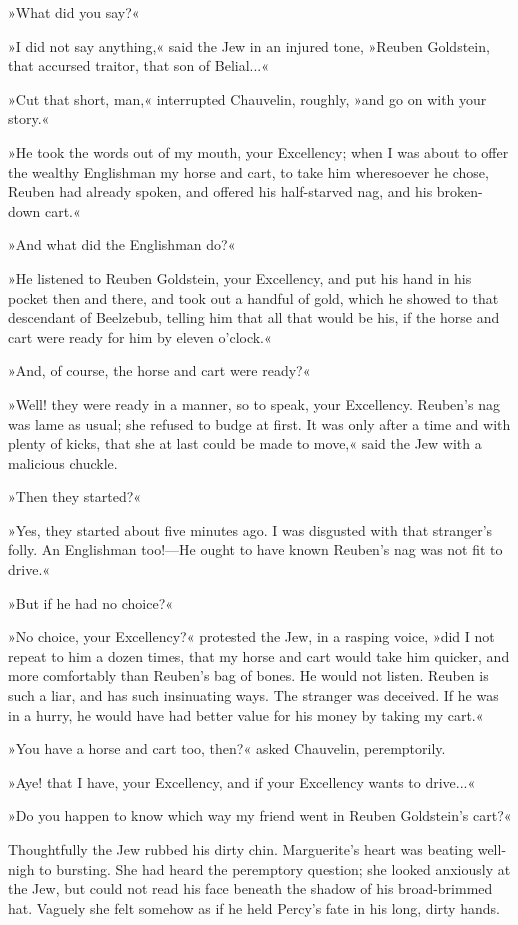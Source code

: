 »What did you say?«

»I did not say anything,« said the Jew in an injured tone, »Reuben Goldstein, that accursed traitor, that son of Belial...«

»Cut that short, man,« interrupted Chauvelin, roughly, »and go on with your story.«

»He took the words out of my mouth, your Excellency; when I was about to offer the wealthy Englishman my horse and cart, to take him wheresoever he chose, Reuben had already spoken, and offered his half-starved nag, and his broken-down cart.«

»And what did the Englishman do?«

»He listened to Reuben Goldstein, your Excellency, and put his hand in his pocket then and there, and took out a handful of gold, which he showed to that descendant of Beelzebub, telling him that all that would be his, if the horse and cart were ready for him by eleven o'clock.«

»And, of course, the horse and cart were ready?«

»Well! they were ready in a manner, so to speak, your Excellency. Reuben's nag was lame as usual; she refused to budge at first. It was only after a time and with plenty of kicks, that she at last could be made to move,« said the Jew with a malicious chuckle.

»Then they started?«

»Yes, they started about five minutes ago. I was disgusted with that stranger's folly. An Englishman too!\allowbreak---\allowbreak He ought to have known Reuben's nag was not fit to drive.«

»But if he had no choice?«

»No choice, your Excellency?« protested the Jew, in a rasping voice, »did I not repeat to him a dozen times, that my horse and cart would take him quicker, and more comfortably than Reuben's bag of bones. He would not listen. Reuben is such a liar, and has such insinuating ways. The stranger was deceived. If he was in a hurry, he would have had better value for his money by taking my cart.«

»You have a horse and cart too, then?« asked Chauvelin, peremptorily.

»Aye! that I have, your Excellency, and if your Excellency wants to drive...«

»Do you happen to know which way my friend went in Reuben Goldstein's cart?«

Thoughtfully the Jew rubbed his dirty chin. Marguerite's heart was beating well-nigh to bursting. She had heard the peremptory question; she looked anxiously at the Jew, but could not read his face beneath the shadow of his broad-brimmed hat. Vaguely she felt somehow as if he held Percy's fate in his long, dirty hands.

